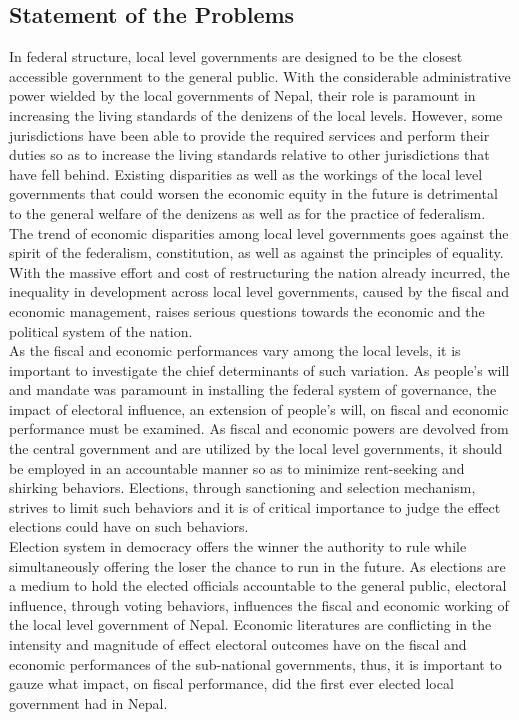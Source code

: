 \subsection{Statement of the Problems}
In federal structure, local level governments are designed to be the closest accessible government to the general public. With the considerable administrative power wielded by the local governments of Nepal, their role is paramount in increasing the living standards of the denizens of the local levels. However, some jurisdictions have been able to provide the required services and perform their duties so as to increase the living standards relative to other jurisdictions that have fell behind. Existing disparities as well as the workings of the local level governments that could worsen the economic equity in the future is detrimental to the general welfare of the denizens as well as for the practice of federalism. The trend of economic disparities among local level governments goes against the spirit of the federalism, constitution, as well as against the principles of equality. With the massive effort and cost of restructuring the nation already incurred, the inequality in development across local level governments, caused by the fiscal and economic management, raises serious questions towards the economic and the political system of the nation. \\
As the fiscal and economic performances vary among the local levels, it is important to investigate the chief determinants of such variation. As people's will and mandate was paramount in installing the federal system of governance, the impact of electoral influence, an extension of people's will, on fiscal and economic performance must be examined. As fiscal and economic powers are devolved from the central government and are utilized by the local level governments, it should be employed in an accountable manner so as to minimize rent-seeking and shirking behaviors. Elections, through sanctioning and selection mechanism, strives to limit such behaviors and it is of critical importance to judge the effect elections could have on such behaviors.  \\
Election system in democracy offers the winner the authority to rule while simultaneously offering the loser the chance to run in the future\cite{Przeworski1999}. As elections are a medium to hold the elected officials accountable to the general public, electoral influence, through voting behaviors, influences the fiscal and economic working of the local level government of Nepal. Economic literatures are conflicting in the intensity and magnitude of effect electoral outcomes have on the fiscal and economic performances of the sub-national governments, thus, it is important to gauze what impact, on fiscal performance, did the first ever elected local government had in  Nepal.  \vspace{-3mm}
